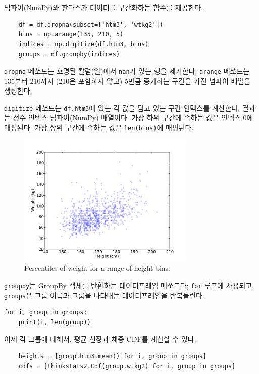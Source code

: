 넘파이(NumPy)와 판다스가 데이터를 구간화하는 함수를 제공한다.

\begin{verbatim}
    df = df.dropna(subset=['htm3', 'wtkg2'])
    bins = np.arange(135, 210, 5)
    indices = np.digitize(df.htm3, bins)
    groups = df.groupby(indices)
\end{verbatim}

{\tt dropna} 메쏘드는 호명된 칼럼(열)에서 {\tt nan}가 있는 행을 제거한다. 
{\tt arange} 메쏘드는 135부터 210까지 (210은 포함하지 않고) 5만큼 증가하는 구간을 가진 넘파이 배열을 생성한다.


{\tt digitize} 메쏘드는 {\tt df.htm3}에 있는 각 값을 담고 있는 구간 인텍스를 계산한다.
결과는 정수 인텍스 넘파이(NumPy) 배열이다. 
가장 하위 구간에 속하는 값은 인덱스 0에 매핑된다. 가장 상위 구간에 속하는 값은 {\tt len(bins)}에 매핑된다.

\begin{figure}
\centerline{\includegraphics[height=2.5in]{figs/scatter3.pdf}}
\caption{Percentiles of weight for a range of height bins.}
\label{scatter3}
\end{figure}

{\tt groupby}는 GroupBy 객체를 반환하는 데이터프레임 메쏘드다;
{\tt for} 루프에 사용되고, {\tt groups}은 그룹 이름과 그룹을 나타내는 데이터프레임을 반복돌린다.

\begin{verbatim}
for i, group in groups:
    print(i, len(group))
\end{verbatim}

이제 각 그룹에 대해서, 평균 신장과 체중 CDF를 계산할 수 있다.

\begin{verbatim}
    heights = [group.htm3.mean() for i, group in groups]
    cdfs = [thinkstats2.Cdf(group.wtkg2) for i, group in groups]
\end{verbatim}

